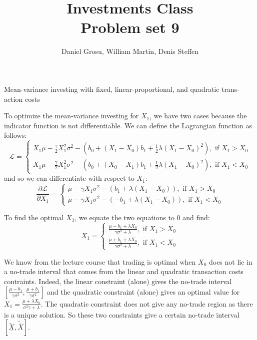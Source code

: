 \documentclass[10pt]{article}
\newenvironment{exercise}[2][Exercise]{\begin{trivlist}
  \item[\hskip \labelsep {\bfseries #1}\hskip \labelsep {\bfseries #2.}]}{\end{trivlist}}
\begin{document}
  \pagecolor{solar}
	
  \renewcommand{\qedsymbol}{\smiley}
	\title{Investments Class \\ Problem set 9}
	\author{Daniel Grosu, William Martin, Denis Steffen}
		
\maketitle

\begin{exercise}{1}{Mean-variance investing with fixed, linear-proportional, and quadratic trans- action costs}

  To optimize the mean-variance investing for $X_1$, we have two cases because the indicator function is not differentiable. We can define the Lagrangian function as follows:
  $$ \mathcal{L} = \begin{cases}
    X_1\mu - \frac{\gamma}{2}X_1^2\sigma^2 - (b_0 + (X_1-X_0)b_1+\frac{1}{2}\lambda(X_1-X_0)^2), \text{ if } X_1> X_0 \\
    X_1\mu - \frac{\gamma}{2}X_1^2\sigma^2 - (b_0 + (X_0-X_1)b_1+\frac{1}{2}\lambda(X_1-X_0)^2), \text{ if } X_1< X_0
  \end{cases}$$ and so we can differentiate with respect to $X_1$:
  $$ \frac{\partial\mathcal{L}}{\partial X_1} = \begin{cases}
    \mu - \gamma X_1\sigma^2 - (b_1+\lambda(X_1-X_0)), \text{ if } X_1> X_0 \\
    \mu - \gamma X_1\sigma^2 - (- b_1+\lambda(X_1-X_0)), \text{ if } X_1< X_0
  \end{cases}$$

  To find the optimal $X_1$, we equate the two equations to $0$ and find: 
  $$ X_1 = \begin{cases}
    \frac{\mu - b_1 + \lambda X_0}{\gamma\sigma^2+\lambda}, \text{ if } X_1> X_0 \\
    \frac{\mu + b_1 + \lambda X_0}{\gamma\sigma^2+\lambda}, \text{ if } X_1< X_0
  \end{cases}$$

  We know from the lecture course that trading is optimal when $X_0$ does not lie in a no-trade interval that comes from the linear and quadratic transaction costs contraints. Indeed, the linear constraint (alone) gives the no-trade interval $[\frac{\mu- b_1}{\gamma\sigma^2},\frac{\mu+b_1}{\gamma\sigma^2}]$ and the quadratic constraint (alone) gives an optimal value for $X_1 = \frac{\mu+\lambda X_0}{\sigma^2\gamma + \lambda}$. The quadratic constraint does not give any no-trade region as there is a unique solution. So these two constraints give a certain no-trade interval $[\tilde{\underline{X}},\tilde{\overline{X}}]$. 


\end{exercise}
\end{document}
